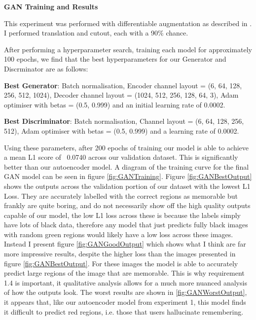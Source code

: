 \documentclass{UoYCSproject}
\begin{document}
\textbf{GAN Training and Results}

This experiment was performed with differentiable augmentation as described in \cite{zhao2020differentiable}. I performed translation and cutout, each with a 90\% chance.

After performing a hyperparameter search, training each model for approximately 100 epochs, we find that the best hyperparameters for our Generator and Discrminator are as follows:

\textbf{Best Generator}: Batch normalisation, Encoder channel layout = (6, 64, 128, 256, 512, 1024), Decoder channel layout = (1024, 512, 256, 128, 64, 3), Adam optimiser with betas = (0.5, 0.999) and an initial learning rate of 0.0002.

\textbf{Best Discriminator}: Batch normalisation, Channel layout = (6, 64, 128, 256, 512), Adam optimiser with betas = (0.5, 0.999) and a learning rate of 0.0002.

Using these parameters, after 200 epochs of training our model is able to achieve a mean L1 score of ~0.0740 across our validation dataset. This is significantly better than our autoencoder model. A diagram of the training curve for the final GAN model can be seen in figure \ref{fig:GANTraining}. 
Figure \ref{fig:GANBestOutput} shows the outputs across the validation portion of our dataset with the lowest L1 Loss. They are accurately labelled with the correct regions as memorable but frankly are quite boring, and do not necessarily show off the high quality outputs capable of our model, the low L1 loss across these is because the labels simply have lots of black data, therefore any model that just predicts fully black images with random green regions would likely have a low loss across these images. 
Instead I present figure \ref{fig:GANGoodOutput} which shows what I think are far more impressive results, despite the higher loss than the images presented in figure \ref{fig:GANBestOutput}. For these images the model is able to accurately predict large regions of the image that are memorable. This is why requirement 1.4 is important, it qualitative analysis allows for a much more nuanced analysis of how the outputs look.  
The worst results are shown in \ref{fig:GANWorstOutput}, it appears that, like our autoencoder model from experiment 1, this model finds it difficult to predict red regions, i.e. those that users hallucinate remembering.
\end{document}
